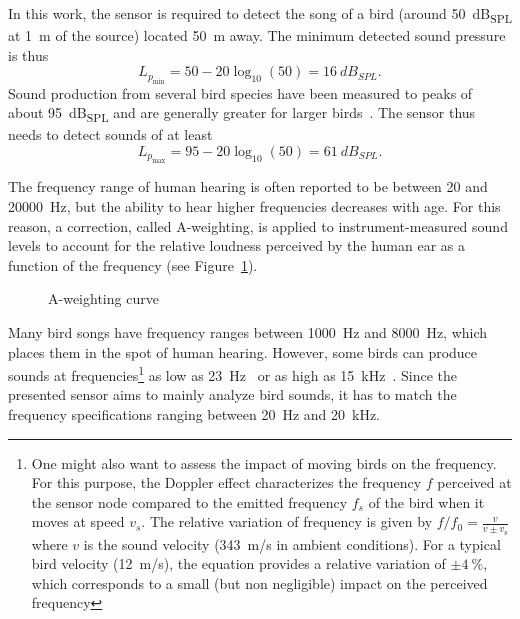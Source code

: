 \documentclass{EPL-master-thesis-covers-EN}
\newcommand{\te}[1]{\textrm{#1}}
\begin{document}
\begin{table}[H]
\centering
{}
\caption{Typical sound pressure levels}
\label{tab:sound_levels}
\end{table}

In this work, the sensor is required to detect the song of a bird (around \SI{50}{dB_{SPL}} at \SI{1}{m} of the source) located \SI{50}{m} away. The minimum detected sound pressure is thus
\[
 L_{p_\te{min}} = 50 - 20\log_{10}(50) = \SI{16}{dB_{SPL}}.
\]
Sound production from several bird species have been measured to peaks of about \SI{95}{dB_{SPL}} and are generally greater for larger birds~\cite{FHWA}. The sensor thus needs to detect sounds of at least
\[
 L_{p_\te{max}} = 95 - 20\log_{10}(50) = \SI{61}{dB_{SPL}}.
\]

The frequency range of human hearing is often reported to be between 20 and \SI{20000}{Hz}, but the ability to hear higher frequencies decreases with age. For this reason, a correction, called A-weighting, is applied to instrument-measured sound levels to account for the relative loudness perceived by the human ear as a function of the frequency (see Figure~\ref{fig:a_weighting}).

\begin{figure}[H]
    \centering
    
    \caption{A-weighting curve}
    \label{fig:a_weighting}
\end{figure}

Many bird songs have frequency ranges between \SI{1000}{Hz} and \SI{8000}{Hz}, which places them in the spot of human hearing. However, some birds can produce sounds at frequencies\footnote{One might also want to assess the impact of moving birds on the frequency. For this purpose, the Doppler effect characterizes the frequency $f$ perceived at the sensor node compared to the emitted frequency $f_s$ of the bird when it moves at speed $v_s$. The relative variation of frequency is given by $ f/f_0 = \frac{v}{v \pm v_\text{s}}$ where $v$ is the sound velocity (\SI{343}{m/s} in ambient conditions). For a typical bird velocity (\SI{12}{m/s}), the equation provides a relative variation of $\pm \SI{4}{\%}$, which corresponds to a small (but non negligible) impact on the perceived frequency} as low as \SI{23}{Hz}~\cite{10.2307/4090277} or as high as \SI{15}{kHz}~\cite{doi:10.1111/j.1474-919X.1962.tb08647.x}. Since the presented sensor aims to mainly analyze bird sounds, it has to match the frequency specifications ranging between \SI{20}{Hz} and \SI{20}{kHz}.
\end{document}

